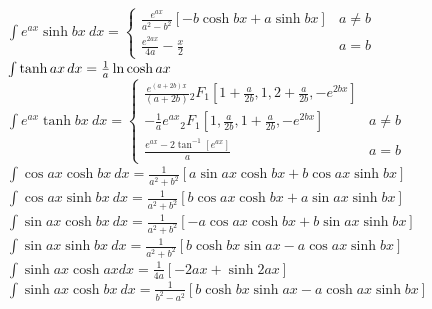 \documentclass[10pt,letterpaper,landscape]{cheatsheet}
\begin{document}
$
\int e^{ax} \sinh bx \ dx =
\begin{cases}
\displaystyle{\frac{e^{ax}}{a^2-b^2} }[ -b \cosh bx + a \sinh bx ]  & a\ne b \\
\displaystyle{\frac{e^{2ax}}{4a} - \frac{x}{2}}  & a = b
\end{cases}
$\\


$
\int  \tanh ax\hspace{1.5pt} dx =\frac{1}{a} \ln \cosh ax 
$\\

$
\int  e^{ax} \tanh bx\ dx = 
\begin{cases}
\displaystyle{ \frac{ e^{(a+2b)x}}{(a+2b)} 
{_2F_1}\left[ 1+\frac{a}{2b},1,2+\frac{a}{2b}, -e^{2bx}\right] }& \\
\displaystyle{
-\frac{1}{a}e^{ax}{_2F_1}\left[ 1, \frac{a}{2b},1+\frac{a}{2b}, -e^{2bx}\right]
}
 & a\ne b \\
\displaystyle{\frac{e^{ax}-2\tan^{-1}[e^{ax}]}{a} } & a = b
\end{cases}
$\\



$
\int \cos ax \cosh bx\ dx = 
\frac{1}{a^2 + b^2} \left[
a \sin ax \cosh bx  + b \cos ax \sinh bx
\right] 
$\\

$
\int \cos ax \sinh bx\ dx = 
\frac{1}{a^2 + b^2} \left[
b \cos ax \cosh bx +
 a \sin ax \sinh bx
\right] 
$\\

$
\int \sin ax \cosh bx \ dx = 
\frac{1}{a^2 + b^2} \left[
-a \cos ax \cosh bx +
 b \sin ax \sinh bx
\right] 
$\\

$
\int \sin ax \sinh bx \ dx = 
\frac{1}{a^2 + b^2} \left[
b \cosh bx \sin ax -
 a \cos ax \sinh bx
\right] 
$\\

$
\int \sinh ax \cosh ax dx= 
\frac{1}{4a}\left[ 
-2ax + \sinh 2ax \right]
$\\

$
\int \sinh ax \cosh bx \ dx = 
\frac{1}{b^2-a^2}\left[ 
b \cosh bx \sinh ax 
- a \cosh ax \sinh bx \right]
$\\
\end{document}
